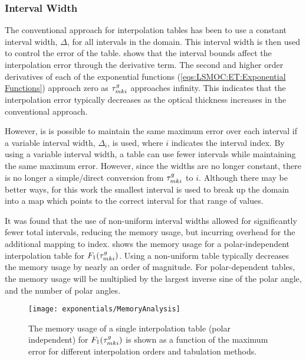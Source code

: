 {{{      \subsubsection{Interval Width}{\label{sssec:LSMOC:ET:Interval Width}
        The conventional approach for interpolation tables has been to use a constant interval width, $\Delta$, for all intervals in the domain.
        This interval width is then used to control the error of the table.
         shows that the interval bounds affect the interpolation error through the derivative term.
        The second and higher order derivatives of each of the exponential functions (\cref{eqs:LSMOC:ET:Exponential Functions}) approach zero as $\segopt$ approaches infinity.
        This indicates that the interpolation error typically decreases as the optical thickness increases in the conventional approach.

        However, is is possible to maintain the same maximum error over each interval if a variable interval width, $\Delta_i$, is used, where $i$ indicates the interval index.
        By using a variable interval width, a table can use fewer intervals while maintaining the same maximum error.
        However, since the widths are no longer constant, there is no longer a simple/direct conversion from $\segopt$ to $i$.
        Although there may be better ways, for this work the smallest interval is used to break up the domain into a map which points to the correct interval for that range of values.

        It was found that the use of non-uniform interval widths allowed for significantly fewer total intervals, reducing the memory usage, but incurring overhead for the additional mapping to index.
         shows the memory usage for a polar-independent interpolation table for $F_1(\segopt)$.
        Using a non-uniform table typically decreases the memory usage by nearly an order of magnitude.
        For polar-dependent tables, the memory usage will be multiplied by the largest inverse sine of the polar angle, and the number of polar angles.

        \begin{figure}
          \centering
          \texttt{[image: exponentials/MemoryAnalysis]}
          \caption{The memory usage of a single interpolation table (polar independent) for $F_1(\segopt)$ is shown as a function of the maximum error for different interpolation orders and tabulation methods.\label{fig:LSMOC:ET:Memory Analysis}}
        \end{figure}
      }
    }
}}
